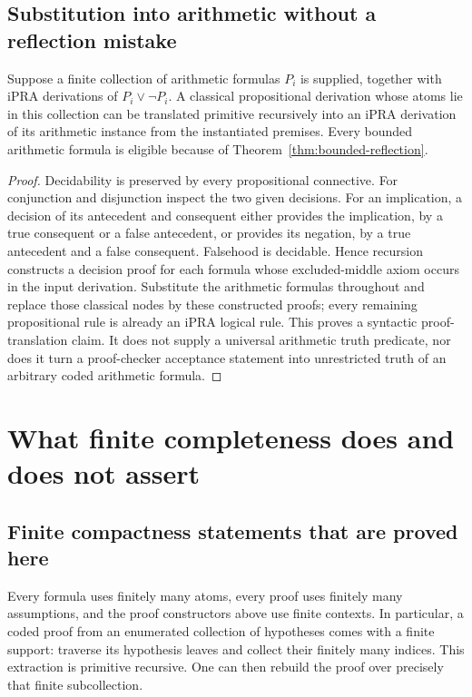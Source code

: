 \subsection{Substitution into arithmetic without a reflection mistake}

\begin{proposition}\label{thm:decidable-instances}
Suppose a finite collection of arithmetic formulas $P_i$ is supplied,
together with iPRA derivations of $P_i\vee\neg P_i$. A classical
propositional derivation whose atoms lie in this collection can be
translated primitive recursively into an iPRA derivation of its arithmetic
instance from the instantiated premises. Every bounded arithmetic formula
is eligible because of Theorem~\ref{thm:bounded-reflection}.
\end{proposition}
\begin{proof}
Decidability is preserved by every propositional connective. For
conjunction and disjunction inspect the two given decisions. For an
implication, a decision of its antecedent and consequent either provides
the implication, by a true consequent or a false antecedent, or provides
its negation, by a true antecedent and a false consequent. Falsehood is
decidable. Hence recursion constructs a decision proof for each formula
whose excluded-middle axiom occurs in the input derivation. Substitute
the arithmetic formulas throughout and replace those classical nodes by
these constructed proofs; every remaining propositional rule is already
an iPRA logical rule. This proves a syntactic proof-translation claim.
It does not supply a universal arithmetic truth predicate, nor does it
turn a proof-checker acceptance statement into unrestricted truth of an
arbitrary coded arithmetic formula.
\end{proof}

\section{What finite completeness does and does not assert}\label{sec:limits}

\subsection{Finite compactness statements that are proved here}

Every formula uses finitely many atoms, every proof uses finitely many
assumptions, and the proof constructors above use finite contexts. In
particular, a coded proof from an enumerated collection of hypotheses
comes with a finite support: traverse its hypothesis leaves and collect
their finitely many indices. This extraction is primitive recursive.
One can then rebuild the proof over precisely that finite subcollection.

